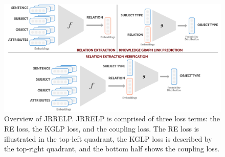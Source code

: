 \begin{figure}[t]
    \centering
    \includegraphics[width=\textwidth]{images/JRELP_figure.png}
    \caption{
        Overview of JRRELP.
        JRRELP is comprised of three loss terms: the RE loss, the KGLP loss, and the coupling loss.
        The RE loss is illustrated in the top-left quadrant, the KGLP loss is described by the top-right quadrant, and the bottom half shows the coupling loss.
        }
    \label{fig:JRRELP-overview}
\end{figure}




